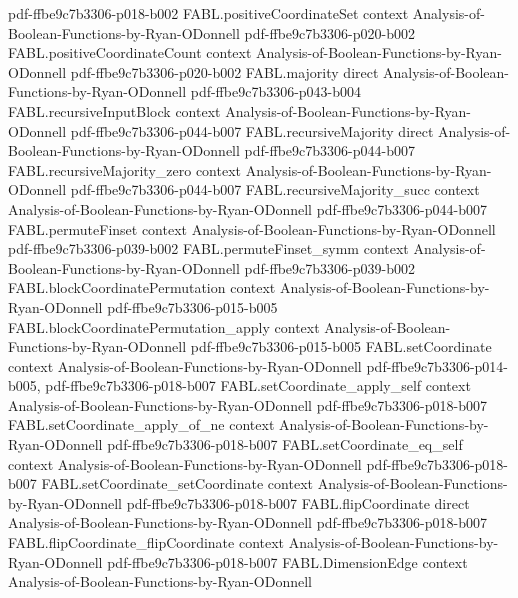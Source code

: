\begin{theorem}
  {pdf-ffbe9c7b3306-p018-b002}
\proofstep
  {FABL.positiveCoordinateSet}
  {context}
  {Analysis-of-Boolean-Functions-by-Ryan-ODonnell}
  {pdf-ffbe9c7b3306-p020-b002}
\proofstep
  {FABL.positiveCoordinateCount}
  {context}
  {Analysis-of-Boolean-Functions-by-Ryan-ODonnell}
  {pdf-ffbe9c7b3306-p020-b002}
\proofstep
  {FABL.majority}
  {direct}
  {Analysis-of-Boolean-Functions-by-Ryan-ODonnell}
  {pdf-ffbe9c7b3306-p043-b004}
\proofstep
  {FABL.recursiveInputBlock}
  {context}
  {Analysis-of-Boolean-Functions-by-Ryan-ODonnell}
  {pdf-ffbe9c7b3306-p044-b007}
\proofstep
  {FABL.recursiveMajority}
  {direct}
  {Analysis-of-Boolean-Functions-by-Ryan-ODonnell}
  {pdf-ffbe9c7b3306-p044-b007}
\proofstep
  {FABL.recursiveMajority_zero}
  {context}
  {Analysis-of-Boolean-Functions-by-Ryan-ODonnell}
  {pdf-ffbe9c7b3306-p044-b007}
\proofstep
  {FABL.recursiveMajority_succ}
  {context}
  {Analysis-of-Boolean-Functions-by-Ryan-ODonnell}
  {pdf-ffbe9c7b3306-p044-b007}
\proofstep
  {FABL.permuteFinset}
  {context}
  {Analysis-of-Boolean-Functions-by-Ryan-ODonnell}
  {pdf-ffbe9c7b3306-p039-b002}
\proofstep
  {FABL.permuteFinset_symm}
  {context}
  {Analysis-of-Boolean-Functions-by-Ryan-ODonnell}
  {pdf-ffbe9c7b3306-p039-b002}
\proofstep
  {FABL.blockCoordinatePermutation}
  {context}
  {Analysis-of-Boolean-Functions-by-Ryan-ODonnell}
  {pdf-ffbe9c7b3306-p015-b005}
\proofstep
  {FABL.blockCoordinatePermutation_apply}
  {context}
  {Analysis-of-Boolean-Functions-by-Ryan-ODonnell}
  {pdf-ffbe9c7b3306-p015-b005}
\proofstep
  {FABL.setCoordinate}
  {context}
  {Analysis-of-Boolean-Functions-by-Ryan-ODonnell}
  {pdf-ffbe9c7b3306-p014-b005,
    pdf-ffbe9c7b3306-p018-b007}
\proofstep
  {FABL.setCoordinate_apply_self}
  {context}
  {Analysis-of-Boolean-Functions-by-Ryan-ODonnell}
  {pdf-ffbe9c7b3306-p018-b007}
\proofstep
  {FABL.setCoordinate_apply_of_ne}
  {context}
  {Analysis-of-Boolean-Functions-by-Ryan-ODonnell}
  {pdf-ffbe9c7b3306-p018-b007}
\proofstep
  {FABL.setCoordinate_eq_self}
  {context}
  {Analysis-of-Boolean-Functions-by-Ryan-ODonnell}
  {pdf-ffbe9c7b3306-p018-b007}
\proofstep
  {FABL.setCoordinate_setCoordinate}
  {context}
  {Analysis-of-Boolean-Functions-by-Ryan-ODonnell}
  {pdf-ffbe9c7b3306-p018-b007}
\proofstep
  {FABL.flipCoordinate}
  {direct}
  {Analysis-of-Boolean-Functions-by-Ryan-ODonnell}
  {pdf-ffbe9c7b3306-p018-b007}
\proofstep
  {FABL.flipCoordinate_flipCoordinate}
  {context}
  {Analysis-of-Boolean-Functions-by-Ryan-ODonnell}
  {pdf-ffbe9c7b3306-p018-b007}
\proofstep
  {FABL.DimensionEdge}
  {context}
  {Analysis-of-Boolean-Functions-by-Ryan-ODonnell}

\end{theorem}

